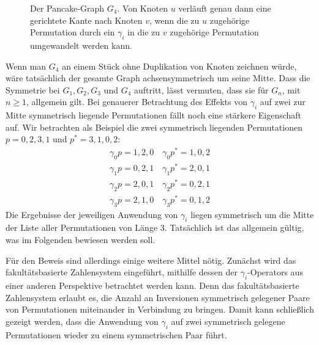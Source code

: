 \documentclass[a4paper, 10pt, ngerman]{article}
\begin{document}
\begin{figure}
    \caption{Der Pancake-Graph $G_4$. Von Knoten $u$ verläuft genau dann eine gerichtete Kante nach Knoten $v$, wenn die zu $u$ zugehörige Permutation durch ein $\gamma_i$ in die zu $v$ zugehörige Permutation umgewandelt werden kann.}
\end{figure}
\newpage

Wenn man $G_4$ an einem Stück ohne Duplikation von Knoten zeichnen würde, wäre tatsächlich der gesamte Graph achsensymmetrisch um seine Mitte. Dass die Symmetrie bei $G_1, G_2, G_3$ und $G_4$ auftritt, lässt vermuten, dass sie für $G_n$, mit $n \ge 1$, allgemein gilt. Bei genauerer Betrachtung des Effekts von $\gamma_i$ auf zwei zur Mitte symmetrisch liegende Permutationen fällt noch eine stärkere Eigenschaft auf. Wir betrachten als Beispiel die zwei symmetrisch liegenden Permutationen $p = 0,2,3,1$ und $p^* = 3, 1, 0, 2$:
\begin{align*}
    \gamma_0 p = 1, 2, 0 \quad \gamma_0 p^* = 1, 0, 2 \\
    \gamma_1 p = 0, 2, 1 \quad \gamma_1 p^* = 2, 0, 1 \\
    \gamma_2 p = 2, 0, 1 \quad \gamma_2 p^* = 0, 2, 1 \\
    \gamma_3 p = 2, 1, 0 \quad \gamma_3 p^* = 0, 1, 2
\end{align*}
Die Ergebnisse der jeweiligen Anwendung von $\gamma_i$ liegen symmetrisch um die Mitte der Liste aller Permutationen von Länge 3. Tatsächlich ist das allgemein gültig, was im Folgenden bewiesen werden soll.

Für den Beweis sind allerdings einige weitere Mittel nötig. Zunächst wird das fakultätsbasierte Zahlensystem eingeführt, mithilfe dessen der $\gamma_i$-Operators aus einer anderen Perspektive betrachtet werden kann. Denn das fakultätsbasierte Zahlensystem erlaubt es, die Anzahl an Inversionen symmetrisch gelegener Paare von Permutationen miteinander in Verbindung zu bringen. Damit kann schließlich gezeigt werden, dass die Anwendung von $\gamma_i$ auf zwei symmetrisch gelegene Permutationen wieder zu einem symmetrischen Paar führt.
\medskip
\end{document}
